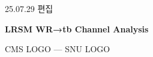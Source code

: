 \documentclass[11pt]{article}
\begin{document}
\begin{center}

\vspace*{2cm}

25.07.29 편집

\vspace{3cm}

{\Huge\textbf{LRSM WR→tb Channel Analysis}}

\vspace{2cm}

CMS LOGO --- SNU LOGO

\end{center}
\end{document}
